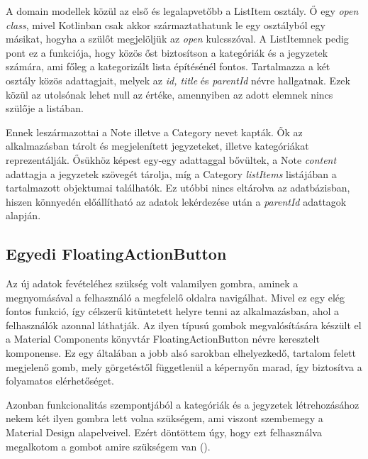 A domain modellek közül az első és legalapvetőbb a ListItem osztály. Ő egy \emph{open class}, mivel Kotlinban csak akkor származtathatunk le egy osztályból egy másikat, hogyha a szülőt megjelöljük az \emph{open} kulcsszóval. A ListItemnek pedig pont ez a funkciója, hogy közös őst biztosítson a kategóriák és a jegyzetek számára, ami főleg a kategorizált lista építésénél fontos. Tartalmazza a két osztály közös adattagjait, melyek az \emph{id, title} és \emph{parentId} névre hallgatnak. Ezek közül az utolsónak lehet null az értéke, amennyiben az adott elemnek nincs szülője a listában. 

Ennek leszármazottai a Note illetve a Category nevet kapták. Ők az alkalmazásban tárolt és megjelenített jegyzeteket, illetve kategóriákat reprezentálják. Ősükhöz képest egy-egy adattaggal bővültek, a Note \emph{content} adattagja a jegyzetek szövegét tárolja, míg a Category \emph{listItems} listájában a tartalmazott objektumai találhatók. Ez utóbbi nincs eltárolva az adatbázisban, hiszen könnyedén előállítható az adatok lekérdezése után a \emph{parentId} adattagok alapján.

\subsection{Egyedi FloatingActionButton}
Az új adatok fevételéhez szükség volt valamilyen gombra, aminek a megnyomásával a felhasználó a megfelelő oldalra navigálhat. Mivel ez egy elég fontos funkció, így célszerű kitüntetett helyre tenni az alkalmazásban, ahol a felhasználók azonnal láthatják. Az ilyen típusú gombok megvalósítására készült el a Material Components könyvtár FloatingActionButton névre keresztelt komponense. Ez egy általában a jobb alsó sarokban elhelyezkedő, tartalom felett megjelenő gomb, mely görgetéstől függetlenül a képernyőn marad, így biztosítva a folyamatos elérhetőséget. 

Azonban funkcionalitás szempontjából a kategóriák és a jegyzetek létrehozásához nekem két ilyen gombra lett volna szükségem, ami viszont szembemegy a Material Design alapelveivel. Ezért döntöttem úgy, hogy ezt felhasználva megalkotom a gombot amire szükségem van ().

